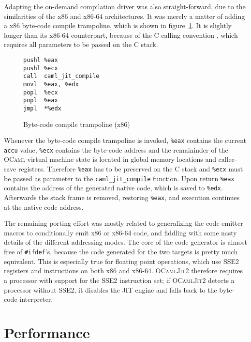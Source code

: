 \documentclass[12pt,a4paper,final]{article}
\begin{document}
Adapting the on-demand compilation driver was also straight-forward, due to
the similarities of the x86 and x86-64 architectures. It was merely a matter
of adding a x86 byte-code compile trampoline, which is shown in
figure~\ref{figure:Byte_code_compile_trampoline_x86}. It is slightly longer
than its x86-64 counterpart, because of the C calling convention \cite{SCO97Abi386},
which requires all parameters to be passed on the C stack.

\begin{figure}[h]
  \centering
  \begin{varwidth}{\linewidth}
  \begin{verbatim}
pushl %eax
pushl %ecx
call  caml_jit_compile
movl  %eax, %edx
popl  %ecx
popl  %eax
jmpl  *%edx
\end{verbatim}
  \end{varwidth}
  \caption{Byte-code compile trampoline (x86)}
  \label{figure:Byte_code_compile_trampoline_x86}
\end{figure}

Whenever the byte-code compile trampoline is invoked, \texttt{\%eax} contains
the current \texttt{accu} value, \texttt{\%ecx} contains the byte-code address
and the remaininder of the \textsc{OCaml} virtual machine state is located in
global memory locations and callee-save registers. Therefore \texttt{\%eax}
has to be preserved on the C stack and \texttt{\%ecx} must be passed as parameter
to the \texttt{caml\_jit\_compile} function. Upon return \texttt{\%eax} contains
the address of the generated native code, which is saved to \texttt{\%edx}.
Afterwards the stack frame is removed, restoring \texttt{\%eax}, and execution
continues at the native code address.

The remaining porting effort was mostly related to generalizing the code
emitter macros to conditionally emit x86 or x86-64 code, and fiddling with
some nasty details of the different addressing modes. The core of the code
generator is almost free of \texttt{\#ifdef}'s, because the code generated
for the two targets is pretty much equivalent. This is especially true for
floating point operations, which use SSE2 registers and instructions on
both x86 and x86-64. \textsc{OCamlJit2} therefore requires a processor
with support for the SSE2 instruction set; if \textsc{OCamlJit2} detects a
processor without SSE2, it disables the JIT engine and falls back to
the byte-code interpreter.


\section{Performance} \label{section:Performance}
\end{document}
